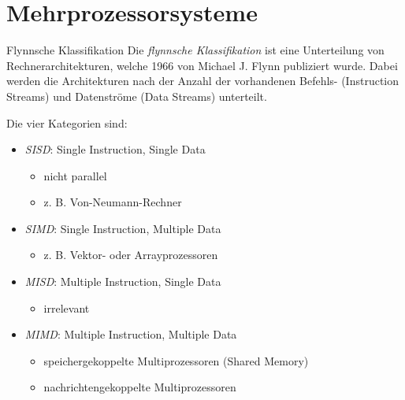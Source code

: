 \section{Mehrprozessorsysteme}

\begin{defi}{Flynnsche Klassifikation}
    Die \emph{flynnsche Klassifikation}  ist eine Unterteilung von Rechnerarchitekturen, welche 1966 von Michael J. Flynn publiziert wurde.
    Dabei werden die Architekturen nach der Anzahl der vorhandenen Befehls- (Instruction Streams) und Datenströme (Data Streams) unterteilt.
    
    Die vier Kategorien sind:
    \begin{itemize}
        \item \emph{SISD}: Single Instruction, Single Data
              \begin{itemize}
                  \item nicht parallel
                  \item z. B. Von-Neumann-Rechner
              \end{itemize}
        \item \emph{SIMD}: Single Instruction, Multiple Data
              \begin{itemize}
                  \item z. B. Vektor- oder Arrayprozessoren
              \end{itemize}
        \item \emph{MISD}: Multiple Instruction, Single Data
              \begin{itemize}
                  \item irrelevant
              \end{itemize}
        \item \emph{MIMD}: Multiple Instruction, Multiple Data
              \begin{itemize}
                  \item speichergekoppelte Multiprozessoren (Shared Memory)
                  \item nachrichtengekoppelte Multiprozessoren
              \end{itemize}
    \end{itemize}
    
    \centering
    \begin{tabular}{cc}
    \end{tabular}
\end{defi}

